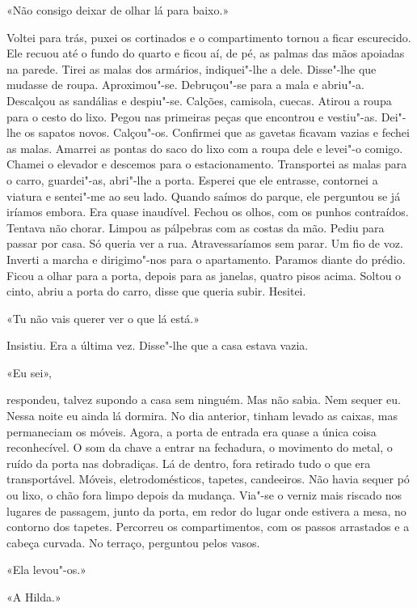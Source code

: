 «Não consigo deixar de olhar lá para baixo.»

Voltei para trás, puxei os cortinados e o compartimento tornou a ficar
escurecido. Ele recuou até o fundo do quarto e ficou aí, de pé, as
palmas das mãos apoiadas na parede. Tirei as malas dos armários,
indiquei"-lhe a dele. Disse"-lhe que mudasse de roupa. Aproximou"-se.
Debruçou"-se para a mala e abriu"-a. Descalçou as sandálias e
despiu"-se. Calções, camisola, cuecas. Atirou a roupa para o cesto do
lixo. Pegou nas primeiras peças que encontrou e vestiu"-as. Dei"-lhe os
sapatos novos. Calçou"-os. Confirmei que as gavetas ficavam vazias e
fechei as malas. Amarrei as pontas do saco do lixo com a roupa dele e
levei"-o comigo. Chamei o elevador e descemos para o estacionamento.
Transportei as malas para o carro, guardei"-as, abri"-lhe a porta.
Esperei que ele entrasse, contornei a viatura e sentei"-me ao seu lado.
Quando saímos do parque, ele perguntou se já iríamos embora. Era quase
inaudível. Fechou os olhos, com os punhos contraídos. Tentava não
chorar. Limpou as pálpebras com as costas da mão. Pediu para passar por
casa. Só queria ver a rua. Atravessaríamos sem parar. Um fio de voz.
Inverti a marcha e dirigimo"-nos para o apartamento. Paramos diante do
prédio. Ficou a olhar para a porta, depois para as janelas, quatro pisos
acima. Soltou o cinto, abriu a porta do carro, disse que queria subir.
Hesitei.

«Tu não vais querer ver o que lá está.»

Insistiu. Era a última vez. Disse"-lhe que a casa estava vazia.

«Eu sei»,

respondeu, talvez supondo a casa sem ninguém. Mas não sabia. Nem sequer
eu. Nessa noite eu ainda lá dormira. No dia anterior, tinham levado as
caixas, mas permaneciam os móveis. Agora, a porta de entrada era quase a
única coisa reconhecível. O som da chave a entrar na fechadura, o
movimento do metal, o ruído da porta nas dobradiças. Lá de dentro, fora
retirado tudo o que era transportável. Móveis, eletrodomésticos,
tapetes, candeeiros. Não havia sequer pó ou lixo, o chão fora limpo
depois da mudança. Via"-se o verniz mais riscado nos lugares de
passagem, junto da porta, em redor do lugar onde estivera a mesa, no
contorno dos tapetes. Percorreu os compartimentos, com os passos
arrastados e a cabeça curvada. No terraço, perguntou pelos vasos.

«Ela levou"-os.»

«A Hilda.»

